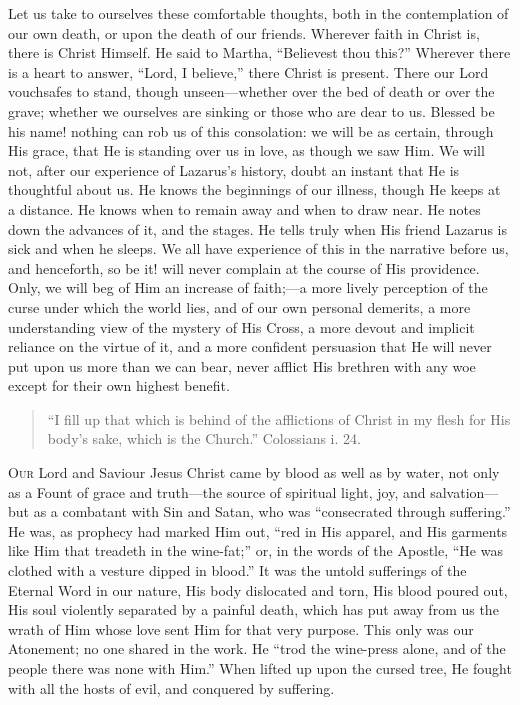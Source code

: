 Let us take to ourselves these comfortable thoughts, both in the
contemplation of our own death, or upon the death of our friends.
Wherever faith in Christ is, there is Christ Himself. He said to
Martha, ``Believest thou this?'' Wherever there is a heart to
answer, ``Lord, I believe,'' there Christ is present. There
our Lord vouchsafes to stand, though unseen—whether over the bed of
death or over the grave; whether we ourselves are sinking or those who
are dear to us. Blessed be his name! nothing can rob us of this
consolation: we will be as certain, through His grace, that He is
standing over us in love, as though we saw Him. We will not, after our
experience of Lazarus's history, doubt an instant that He is
thoughtful about us. He knows the beginnings of our illness, though He
keeps at a distance. He knows when to remain away and when to draw
near. He notes down the advances of it, and the stages. He tells truly
when His friend Lazarus is sick and when he sleeps. We all have
experience of this in the narrative before us, and henceforth, so be
it! will never complain at the course of His providence. Only, we will
beg of Him an increase of faith;—a more lively perception of the curse
under which the world lies, and of our own personal demerits, a more
understanding view of the mystery of His Cross, a more devout and
implicit reliance on the virtue of it, and a more confident persuasion
that He will never put upon us more than we can bear, never afflict
His brethren with any woe except for their own highest benefit.


\begin{quote}

``I fill up that which is behind of the afflictions of Christ
in my flesh for His body's sake, which is the Church.''
Colossians i. 24.

\end{quote}

O\textsc{ur} Lord and Saviour Jesus Christ came by blood as well as by
water, not only as a Fount of grace and truth—the source of
spiritual light, joy, and salvation—but as a combatant with Sin and
Satan, who was ``consecrated through suffering.'' He was, as
prophecy had marked Him out, ``red in His apparel, and His
garments like Him that treadeth in the wine-fat;'' or, in the
words of the Apostle, ``He was clothed with a vesture dipped in
blood.'' It was the untold sufferings of the Eternal Word in our
nature, His body dislocated and torn, His blood poured out, His soul
violently separated by a painful death, which has put away from us the
wrath of Him whose love sent Him for that very purpose. This only was
our Atonement; no one shared in the work. He ``trod the wine-press
alone, and of the people there was none with Him.'' When lifted up
upon the cursed tree, He fought with all the hosts of evil, and
conquered by suffering.

